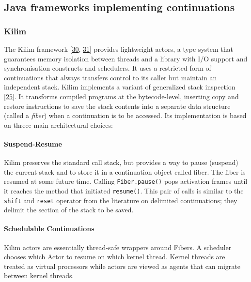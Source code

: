 \documentclass[12pt,a4paper,oneside,openright]{book}
\let\oldparagraph\paragraph
\renewcommand{\paragraph}[1]{\oldparagraph{#1}\mbox{}}
\begin{document}
\subsection{Java frameworks implementing
continuations}\label{java-frameworks-implementing-continuations}

\subsubsection{Kilim}\label{kilim}

The Kilim framework {[}\hyperref[ref-Srinivasan2006]{30},
\hyperref[ref-Bolton2000]{31}{]} provides lightweight actors, a type
system that guarantees memory isolation between threads and a library
with I/O support and synchronisation constructs and schedulers. It uses
a restricted form of continuations that always transfers control to its
caller but maintain an independent stack. Kilim implements a variant of
generalized stack inspection {[}\hyperref[ref-Pettyjohn2005]{25}{]}. It
transforms compiled programs at the bytecode-level, inserting copy and
restore instructions to save the stack contents into a separate data
structure (called a \emph{fiber}) when a continuation is to be accessed.
Its implementation is based on threee main architectural choices:

\paragraph{Suspend-Resume}\label{suspend-resume}

Kilim preserves the standard call stack, but provides a way to pause
(suspend) the current stack and to store it in a continuation object
called fiber. The fiber is resumed at some future time. Calling
\texttt{Fiber.pause()} pops activation frames until it reaches the
method that initiated \texttt{resume()}. This pair of calls is similar
to the \texttt{shift} and \texttt{reset} operator from the literature on
delimited continuations; they delimit the section of the stack to be
saved.

\paragraph{Schedulable Continuations}\label{schedulable-continuations}

Kilim actors are essentially thread-safe wrappers around Fibers. A
scheduler chooses which Actor to resume on which kernel thread. Kernel
threads are treated as virtual processors while actors are viewed as
agents that can migrate between kernel threads.
\end{document}
